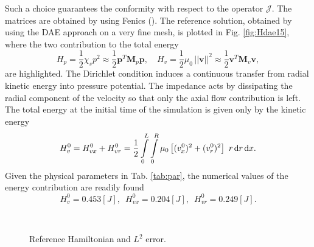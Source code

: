 \documentclass{ifacconf}
\begin{document}
Such a choice guarantees the conformity with respect to the operator $\mathcal{J}$. The matrices are obtained by using Fenics (\cite{LoggMardalEtAl2012}). 
The reference solution, obtained by using the DAE approach on a very fine mesh, is plotted in Fig. \ref{fig:Hdae15}, where the two contribution to the total energy
\[
H_p = \frac{1}{2} \chi_s p^2  \approx \frac{1}{2} \mathbf{p}^T \mathbf{M}_p \mathbf{p}, \quad H_v = \frac{1}{2} \mu_0 \, ||\mathbf{v}||^2 \approx \frac{1}{2} \mathbf{v}^T \mathbf{M}_v \mathbf{v}, \]
are highlighted. The Dirichlet condition induces a continuous transfer from radial kinetic energy into pressure potential. The impedance acts by dissipating the radial component of the velocity so that only the axial flow contribution is left. The total energy at the initial time of the simulation is given only by the kinetic energy
\[
H_v^0 = H_{vx}^0 + H_{vr}^0 = \frac{1}{2} \int_{0}^L\int_{0}^R  \mu_0 \left[(v_x^0)^2 + (v_r^0)^2 \right] \ r \d{r}\d{x}.
\]
Given the physical parameters in Tab. \ref{tab:par}, the numerical values of the energy contribution are readily found
\[H_v^0 = 0.453 [J], \ \; H_{vx}^0 = 0.204 [J], \ \; H_{vr}^0 = 0.249 [J].\]

\begin{figure}[ht]%
	\centering
	\hspace{8pt}%
	 \\
	\caption[]{Reference Hamiltonian and $L^2$ error.}%
	\label{fig:Href_err}%
\end{figure}
\end{document}
